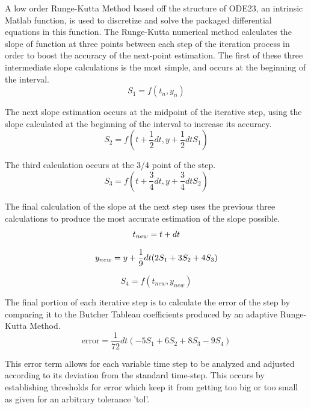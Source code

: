\documentclass[letterpaper, twoside]{article}
\numberwithin{equation}{section}
\begin{document}
A low order Runge-Kutta Method based off the structure of ODE23, an intrinsic Matlab function, is used to discretize and solve the packaged differential equations in this function. The Runge-Kutta numerical method calculates the slope of function at three points between each step of the iteration process in order to boost the accuracy of the next-point estimation. The first of these three intermediate slope calculations is the most simple, and occurs at the beginning of the interval.
\begin{equation} \label{eq: S_1}
  S_1 = f(t_n,y_n)
\end{equation}

The next slope estimation occurs at the midpoint of the iterative step, using the slope calculated at the beginning of the interval to increase its accuracy.
\begin{equation} \label{eq: S_2}
  S_2 = f(t + \frac{1}{2} dt,y + \frac{1}{2} dt S_1)
\end{equation}

The third calculation occurs at the 3/4  point of the step.
\begin{equation} \label{eq: S_3}
  S_3 = f(t + \frac{3}{4} dt,y+\frac{3}{4} dt S_2)
\end{equation}

The final calculation of the slope at the next step uses the previous three calculations to produce the most accurate estimation of the slope possible. 
\begin{equation} \label{eq: t_{new}}
  t_{new} = t + dt
\end{equation}

\begin{equation} \label{eq: y_{new}}
  y_{new} = y + \frac{1}{9} dt (2 S_1 + 3 S_2 + 4 S_3)
\end{equation}

\begin{equation} \label{eq: S_4}
  S_4 = f(t_{new},y_{new})
\end{equation}

The final portion of each iterative step is to calculate the error of the step by comparing it to the Butcher Tableau coefficients produced by an adaptive Runge-Kutta Method.
\begin{equation} \label{eq: errorfunction}
  \mathrm{error} = \frac{1}{72} dt (-5 S_1 + 6 S_2 + 8 S_3 - 9 S_4)
\end{equation}

This error term allows for each variable time step to be analyzed and adjusted according to its deviation from the standard time-step. This occurs by establishing thresholds for error which keep it from getting too big or too small as given for an arbitrary tolerance 'tol'.
\end{document}
